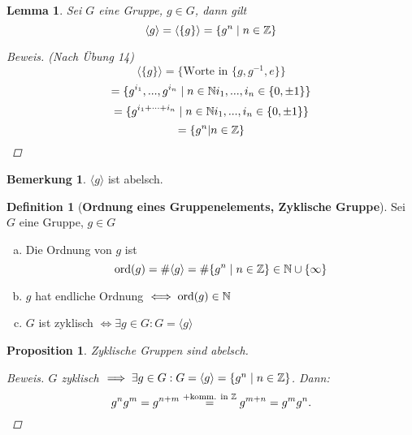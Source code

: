 \documentclass[a4paper]{report}
\theoremstyle{plain}
\newtheorem{lemm}[thm]{Lemma}
\newtheorem{prop}[thm]{Proposition}
\theoremstyle{definition}
\newtheorem{defi}[thm]{Definition}
\newtheorem*{bem*}{Bemerkung}
\begin{document}
\begin{lemm}
Sei $G$ eine Gruppe, $g \in G$, dann gilt
$$\langle g \rangle = \langle \{g\} \rangle = \{g^{n} \mid n \in \Bbb Z\}$$
\begin{proof}[Beweis]
(Nach Übung 14) $$\langle \{g\} \rangle = \{\text{Worte in } \{g, g^{-1}, e\}\}$$
$$ = \{g^{i_{1}}, ..., g^{i_{n}} \mid n \in \Bbb N i_{1}, ..., i_{n} \in \{0, \pm 1\}\}$$
$$= \{g^{i_{1}+\cdots + i_{n}} \mid n \in \Bbb N i_{1}, ..., i_{n} \in \{0, \pm 1\}\}$$
$$= \{g^{n} | n \in \Bbb Z\}$$
\end{proof}
\end{lemm}
\begin{bem*}$\langle g \rangle$ ist abelsch.\end{bem*}
\begin{defi}[\textbf{Ordnung eines Gruppenelements, Zyklische Gruppe}]
  Sei $G$ eine Gruppe, $g \in G$

\begin{enumerate}[(a)]

 \item Die Ordnung von $g$ ist
$$\mathrm{ord}(g) = \# \langle g \rangle = \# \{ g^{n} \mid n \in \Bbb{Z} \} \in \Bbb{N} \cup \{\infty\}$$
 \item$g$ hat endliche Ordnung $\iff \mathrm{ord}(g) \in \Bbb N$
 \item $G$ ist zyklisch $\iff \exists g \in G : G = \langle g \rangle$
\end{enumerate}
\end{defi}


\begin{prop}
  Zyklische Gruppen sind abelsch.
  \begin{proof}[Beweis]
$G$ zyklisch $\implies \exists g \in G : G = \langle g \rangle = \{ g^{n} \mid n \in \Bbb{Z} \}$. Dann: $$g^{n}g^{m} = g^{n+m} \overset{+ \text{komm. in } \Bbb Z}= g^{m+n} = g^{m}g^{n}.$$
  \end{proof}
\end{prop}
\end{document}
